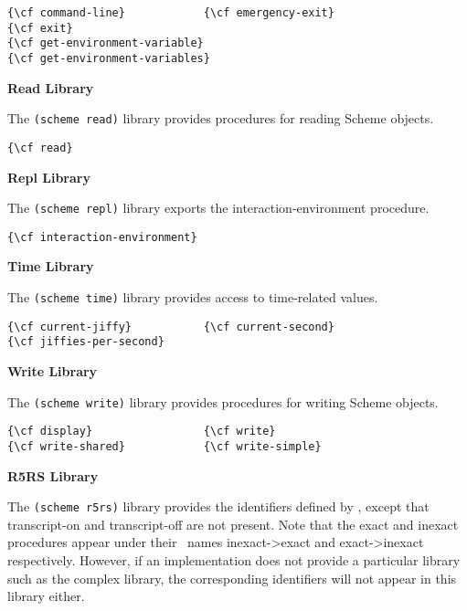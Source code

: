 \begin{verbatim}
{\cf command-line}            {\cf emergency-exit}
{\cf exit}
{\cf get-environment-variable}
{\cf get-environment-variables}
\end{verbatim}

\textbf{Read Library}

The \texttt{(scheme read)} library provides procedures for reading
Scheme objects.

\begin{verbatim}
{\cf read}
\end{verbatim}

\textbf{Repl Library}

The \texttt{(scheme repl)} library exports the {\cf
  interaction-environment} procedure.

\begin{verbatim}
{\cf interaction-environment}
\end{verbatim}

\textbf{Time Library}

The \texttt{(scheme time)} library provides access to time-related values.

\begin{verbatim}
{\cf current-jiffy}           {\cf current-second}
{\cf jiffies-per-second}
\end{verbatim}

\textbf{Write Library}

The \texttt{(scheme write)} library provides procedures for writing
Scheme objects.

\begin{verbatim}
{\cf display}                 {\cf write}
{\cf write-shared}            {\cf write-simple}
\end{verbatim}

\textbf{R5RS Library}

The \texttt{(scheme r5rs)} library provides the identifiers defined by
\rfivers, except that
{\cf transcript-on} and {\cf transcript-off} are not present.
Note that
the {\cf exact} and {\cf inexact} procedures appear under their \rfivers\ names
{\cf inexact->exact} and {\cf exact->inexact} respectively.
However, if an implementation does not provide a particular library such as the
complex library, the corresponding identifiers will not appear in this
library either.


